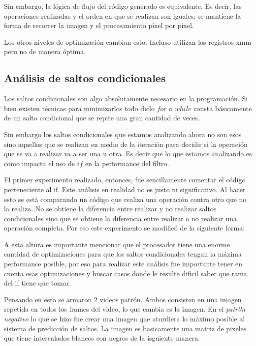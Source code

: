 Sin embargo, la lógica de flujo del código generado es equivalente. Es decir, las operaciones realizadas y el orden en que se realizan son iguales; se mantiene la forma de recorrer la imagen y el procesamiento píxel por píxel.

	Los otros niveles de optimización cambian esto. Incluso utilizan los registros xmm
pero no de manera óptima.


\subsection{Análisis de saltos condicionales}

	Los saltos condicionales son algo absolutamente necesario en la programación.
Si bien existen técnicas para minimizarlos todo diclo $for$ o $while$ consta
básicamente de un salto condicional que se repite una gran cantidad de veces.

	Sin embargo los saltos condicionales que estamos analizando ahora no son
esos sino aquellos que se realizan en medio de la iteración para decidir
si la operación que se va a realizar va a ser una u otra. Es decir que lo
que estamos analizando es como impacta el uso de $if$ en la performance
del filtro.

	
	El primer experimento realizado, entonces, fue sencillamente comentar
el código perteneciente al if. Este análisis en realidad no es justo
ni significativo. Al hacer esto se está comparando un código
que realiza una operación contra otro que no la realiza.
No se obtiene la diferencia entre realizar y no realizar saltos
condicionales sino que se obtiene la diferencia entre realizar
o no realizar una operación completa. Por eso este experimento
se modificó de la siguiente forma:

	A esta altura es importante mencionar que el procesador tiene una enorme
cantidad de optimizaciones para que los saltos condicionales
tengan la máxima performance posible, por eso para realizar este
análisis fue importante tener en cuenta esas optimizaciones y buscar
casos donde le resulte dificil saber que rama del if tiene que tomar.

	Pensando en esto se armaron 2 videos patrón. Ambos consisten
en una imagen repetida en todos los frames del video, lo que
cambia es la imagen.
	En el \textit{patr0n negativo} lo que se hizo fue crear una imagen
que aturdiera lo máximo posible al sistema de predicción de saltos.
La imagen es basicamente una matriz de pixeles que tiene
intercalados blancos con negros de la isguiente manera.

